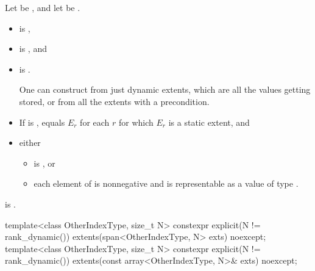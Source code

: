 \begin{itemdescr}
\pnum
Let  be ,
and let  be
.

\pnum
\constraints
\begin{itemize}
\item
{} is ,
\item
{} is , and
\item
{} is .
\begin{note}
One can construct  from just dynamic extents,
which are all the values getting stored, or
from all the extents with a precondition.
\end{note}
\end{itemize}

\pnum
\expects
\begin{itemize}
\item
If  is ,
 equals $E_r$
for each $r$ for which $E_r$ is a static extent, and
\item
either
\begin{itemize}
\item
{} is , or
\item
each element of  is nonnegative and
is representable as a value of type .
\end{itemize}
\end{itemize}

\pnum
\ensures
{} is .
\end{itemdescr}

%
\begin{itemdecl}
template<class OtherIndexType, size_t N>
  constexpr explicit(N != rank_dynamic())
    extents(span<OtherIndexType, N> exts) noexcept;
template<class OtherIndexType, size_t N>
  constexpr explicit(N != rank_dynamic())
    extents(const array<OtherIndexType, N>& exts) noexcept;
\end{itemdecl}

